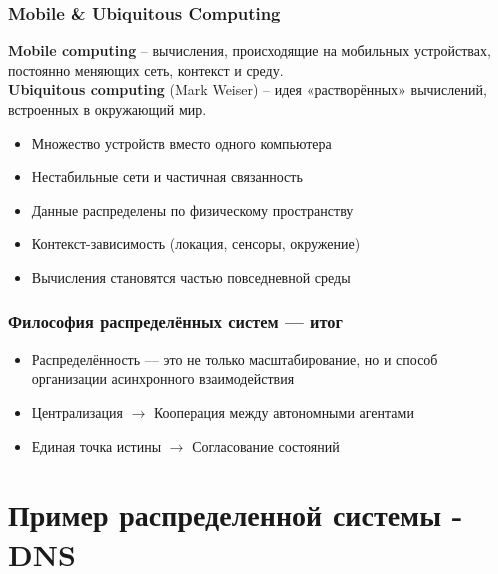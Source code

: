 \documentclass{beamer}
\begin{document}
\begin{frame}
  \frametitle{Mobile \& Ubiquitous Computing}

  {\bfseries Mobile computing} – вычисления, происходящие на мобильных устройствах,
  постоянно меняющих сеть, контекст и среду. \\

  {\bfseries Ubiquitous computing} (Mark Weiser) – идея «растворённых» вычислений,
  встроенных в окружающий мир. \\

 \begin{itemize}
    \item Множество устройств вместо одного компьютера
    \item Нестабильные сети и частичная связанность
    \item Данные распределены по физическому пространству
    \item Контекст-зависимость (локация, сенсоры, окружение)
    \item Вычисления становятся частью повседневной среды
  \end{itemize}
\end{frame}


\begin{frame}
  \frametitle{Философия распределённых систем — итог}

 \begin{itemize}
    \item Распределённость — это не только масштабирование,
          но и способ организации асинхронного взаимодействия

    \item Централизация $\rightarrow$ Кооперация между автономными агентами

    \item Единая точка истины $\rightarrow$ Согласование состояний
  \end{itemize}
  
\end{frame}


\section{Пример распределенной системы - DNS}
\end{document}
